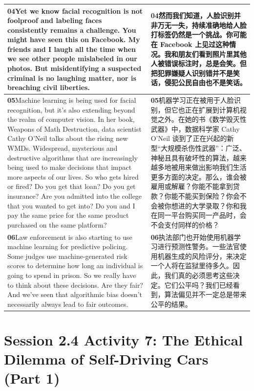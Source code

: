 \documentclass[UTF8,zihao=-4,fontset=fandol]{ctexart}
\newcommand{\TranscriptColumn}{\raggedright\arraybackslash\hyphenpenalty=10000\exhyphenpenalty=10000\sloppy}
\begin{document}
\begin{longtable}{>{\TranscriptColumn}p{} >{\TranscriptColumn}p{}}
\textbf{04}\quad Yet we know facial recognition is not foolproof and labeling faces consistently remains a challenge. You might have seen this on Facebook. My friends and I laugh all the time when we see other people mislabeled in our photos. But misidentifying a suspected criminal is no laughing matter, nor is breaching civil liberties. & \textbf{04}\quad 然而我们知道，人脸识别并非万无一失，持续准确地给人脸打标签仍然是一个挑战。你可能在 Facebook 上见过这种情况。我和朋友们看到照片里其他人被错误标注时，总是会笑。但把犯罪嫌疑人识别错并不是笑话，侵犯公民自由也不是笑话。 \\ \hline
\textbf{05}\quad Machine learning is being used for facial recognition, but it's also extending beyond the realm of computer vision. In her book, Weapons of Math Destruction, data scientist Cathy O'Neil talks about the rising new WMDs. Widespread, mysterious and destructive algorithms that are increasingly being used to make decisions that impact more aspects of our lives. So who gets hired or fired? Do you get that loan? Do you get insurance? Are you admitted into the college that you wanted to get into? Do you and I pay the same price for the same product purchased on the same platform? & \textbf{05}\quad 机器学习正在被用于人脸识别，但它也正在扩展到计算机视觉之外。在她的书《数学毁灭性武器》中，数据科学家 Cathy O'Neil 谈到了正在兴起的新型“大规模杀伤性武器”：广泛、神秘且具有破坏性的算法，越来越多地被用来做出影响我们生活更多方面的决定。那么，谁会被雇用或解雇？你能不能拿到贷款？你能不能买到保险？你会不会被你想进的大学录取？你和我在同一平台购买同一产品时，会不会支付同样的价格？ \\ \hline
\textbf{06}\quad Law enforcement is also starting to use machine learning for predictive policing. Some judges use machine-generated risk scores to determine how long an individual is going to spend in prison. So we really have to think about these decisions. Are they fair? And we've seen that algorithmic bias doesn't necessarily always lead to fair outcomes. & \textbf{06}\quad 执法部门也开始使用机器学习进行预测性警务。一些法官使用机器生成的风险评分，来决定一个人将在监狱里待多久。因此，我们真的必须思考这些决定。它们公平吗？我们已经看到，算法偏见并不一定总是带来公平的结果。 \\ \hline
\end{longtable}


\clearpage
\section{Session 2.4 Activity 7: The Ethical Dilemma of Self-Driving Cars (Part 1)}
\end{document}
